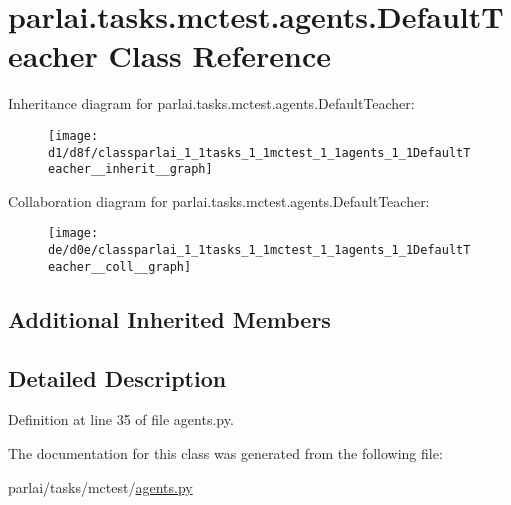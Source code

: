 \hypertarget{classparlai_1_1tasks_1_1mctest_1_1agents_1_1DefaultTeacher}{}\section{parlai.\+tasks.\+mctest.\+agents.\+Default\+Teacher Class Reference}
\label{classparlai_1_1tasks_1_1mctest_1_1agents_1_1DefaultTeacher}


Inheritance diagram for parlai.\+tasks.\+mctest.\+agents.\+Default\+Teacher\+:\nopagebreak
\begin{figure}[H]
\begin{center}
\leavevmode
\texttt{[image: d1/d8f/classparlai\_1\_1tasks\_1\_1mctest\_1\_1agents\_1\_1DefaultTeacher\_\_inherit\_\_graph]}
\end{center}
\end{figure}


Collaboration diagram for parlai.\+tasks.\+mctest.\+agents.\+Default\+Teacher\+:\nopagebreak
\begin{figure}[H]
\begin{center}
\leavevmode
\texttt{[image: de/d0e/classparlai\_1\_1tasks\_1\_1mctest\_1\_1agents\_1\_1DefaultTeacher\_\_coll\_\_graph]}
\end{center}
\end{figure}
\subsection*{Additional Inherited Members}


\subsection{Detailed Description}


Definition at line 35 of file agents.\+py.



The documentation for this class was generated from the following file\+:\begin{DoxyCompactItemize}
\item 
parlai/tasks/mctest/\hyperlink{parlai_2tasks_2mctest_2agents_8py}{agents.\+py}\end{DoxyCompactItemize}
